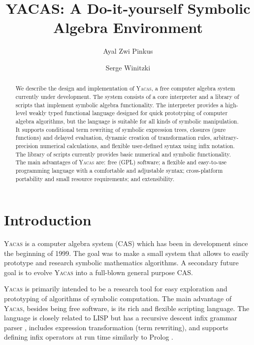\documentclass{llncs}
\begin{document}
\title{YACAS: A Do-it-yourself Symbolic Algebra Environment}

\author{Ayal Zwi Pinkus \and Serge Winitzki}

\maketitle

\begin{abstract}
We describe the design and implementation of \textsc{Yacas}, a free computer
algebra system currently under development.  The system consists of a core
interpreter and a library of scripts that implement symbolic algebra
functionality.  The interpreter provides a high-level weakly typed functional
language designed for quick prototyping of computer algebra algorithms, but the
language is suitable for all kinds of symbolic manipulation. It supports
conditional term rewriting of symbolic expression trees, closures (pure
functions) and delayed evaluation, dynamic creation of transformation rules,
arbitrary-precision numerical calculations, and flexible user-defined syntax
using infix notation.  The library of scripts currently provides basic
numerical and symbolic functionality. The main advantages of \textsc{Yacas} are: free (GPL)
software; a
flexible and easy-to-use programming language with a comfortable and adjustable
syntax; cross-platform portability and small resource requirements; and extensibility.
\end{abstract}



\section{Introduction}
\textsc{Yacas} is a computer algebra system (CAS) which has been in development since the beginning of 1999.
The goal was to make a small system that allows to easily prototype and
research symbolic mathematics algorithms. A secondary future goal is to evolve
\textsc{Yacas} into a full-blown general purpose CAS.


\textsc{Yacas} is primarily intended to be a research tool for easy
exploration and prototyping of algorithms of symbolic
computation.  The main advantage of \textsc{Yacas}, besides being free software, is its rich and flexible
scripting language. The language is closely related to LISP \cite{WH89} but has
a recursive descent infix grammar parser \cite{ASU86}, includes expression
transformation (term rewriting), and supports defining infix operators at run time
similarly to Prolog \cite{B86}.
\end{document}
